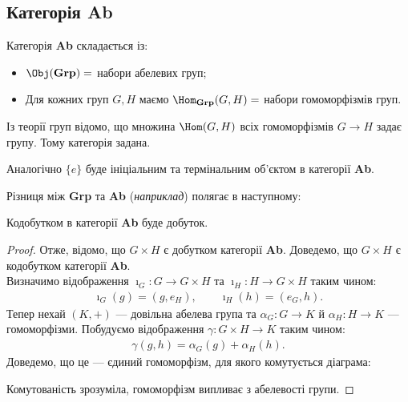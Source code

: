 \documentclass{math_library}
\begin{document}
\subsection{Категорія \textbf{Ab}}
Категорія \textbf{Ab} складається із:
\begin{itemize}[nosep]
\item $\Obj(\textbf{Grp}) = $ набори абелевих груп;
\item Для кожних груп $G,H$ маємо $\Hom_\textbf{Grp}(G,H) = $ набори гомоморфізмів груп.
\end{itemize}
Із теорії груп відомо, що множина $\Hom(G,H)$ всіх гомоморфізмів $G \to H$ задає групу. Тому категорія задана.

\begin{remark}
Аналогічно $\{e\}$ буде ініціальним та термінальним об'єктом в категорії \textbf{Ab}.
\end{remark}

Різниця між \textbf{Grp} та \textbf{Ab} (\textit{наприклад}) полягає в наступному:

\begin{proposition}
Кодобутком в категорії \textbf{Ab} буде добуток.
\end{proposition}

\begin{proof}
Отже, відомо, що $G \times H$ є добутком категорії \textbf{Ab}. Доведемо, що $G \times H$ є кодобутком категорії \textbf{Ab}.
\bigskip \\
Визначимо відображення $\imath_G \colon G \to G \times H$ та $\imath_H \colon H \to G \times H$ таким чином:
\begin{align*}
\imath_G(g) = (g,e_H), \qquad \imath_H(h) = (e_G,h).
\end{align*}
Тепер нехай $(K,+)$ --- довільна абелева група та $\alpha_G \colon G \to K$ й $\alpha_H \colon H \to K$ --- гомоморфізми. Побудуємо відображення $\gamma \colon G \times H \to K$ таким чином:
\begin{align*}
\gamma(g,h) = \alpha_G(g) + \alpha_H(h).
\end{align*}
Доведемо, що це --- єдиний гомоморфізм, для якого комутується діаграма:
\begin{figure}[H]
\centering
{}
\end{figure}
Комутованість зрозуміла, гомоморфізм випливає з абелевості групи.
\end{proof}
\end{document}
